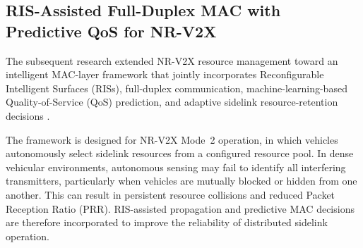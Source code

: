 \begin{table}[!ht]
\centering
\caption{Comparison of performance metrics at low and high densities with percentage improvement.}
\label{tab:isac_performance_comparison}

\end{table}


\subsection{RIS-Assisted Full-Duplex MAC with Predictive QoS for NR-V2X}
\label{subsec:ris_fd_mac_nrv2x}

The subsequent research extended NR-V2X resource management
toward an intelligent MAC-layer framework that jointly incorporates
Reconfigurable Intelligent Surfaces (RISs), full-duplex communication,
machine-learning-based Quality-of-Service (QoS) prediction, and
adaptive sidelink resource-retention decisions
\cite{indulekha2025risfd}.

The framework is designed for NR-V2X Mode~2 operation, in which
vehicles autonomously select sidelink resources from a configured
resource pool. In dense vehicular environments, autonomous sensing
may fail to identify all interfering transmitters, particularly when
vehicles are mutually blocked or hidden from one another. This can
result in persistent resource collisions and reduced Packet Reception
Ratio (PRR). RIS-assisted propagation and predictive MAC decisions
are therefore incorporated to improve the reliability of distributed
sidelink operation.

